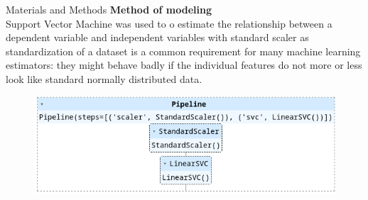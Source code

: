 \begin{frame}{Materials and Methods}
    \textbf{Method of modeling}\\
    \vspace{2em}
    Support Vector Machine was used to o estimate the relationship between a dependent variable and independent variables with standard scaler as standardization of a dataset is a common requirement for many machine learning estimators: they might behave badly if the individual features do not more or less look like standard normally distributed data.
    
    \begin{figure}[H]
        \includegraphics[width=\textwidth]{pipeline}
    \end{figure}
\end{frame}

